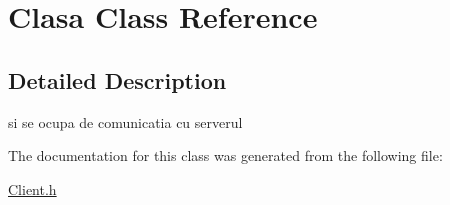 \hypertarget{class_clasa}{\section{Clasa Class Reference}
\label{class_clasa}
}


\subsection{Detailed Description}
si se ocupa de comunicatia cu serverul 

The documentation for this class was generated from the following file\-:\begin{DoxyCompactItemize}
\item 
\hyperlink{_client_8h}{Client.\-h}\end{DoxyCompactItemize}
